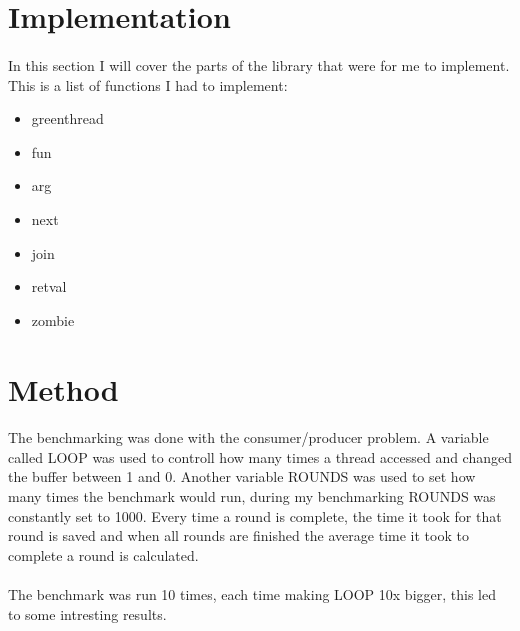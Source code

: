 \documentclass[11pt]{article}
\begin{document}
\section{Implementation}

\paragraph{}
In this section I will cover the parts of the library that were for me to implement. \\ 
This is a list of functions I had to implement:

\begin{itemize}
    \setlength\itemsep{0.1em}
    \item green\textunderscore thread
    \item fun
    \item arg
    \item next
    \item join
    \item retval
    \item zombie
\end{itemize}

\paragraph{}


\section{Method}

\paragraph{}
The benchmarking was done with the consumer/producer problem. A variable called LOOP was used to controll how many times a thread accessed and 
changed the buffer between 1 and 0. Another variable ROUNDS was used to set how many times the benchmark would run, during my benchmarking 
ROUNDS was constantly set to 1000. Every time a round is complete, the time it took for that round is saved and when all rounds are finished
the average time it took to complete a round is calculated.

\paragraph{}
The benchmark was run 10 times, each time making LOOP 10x bigger, this led to some intresting results.
\end{document}

